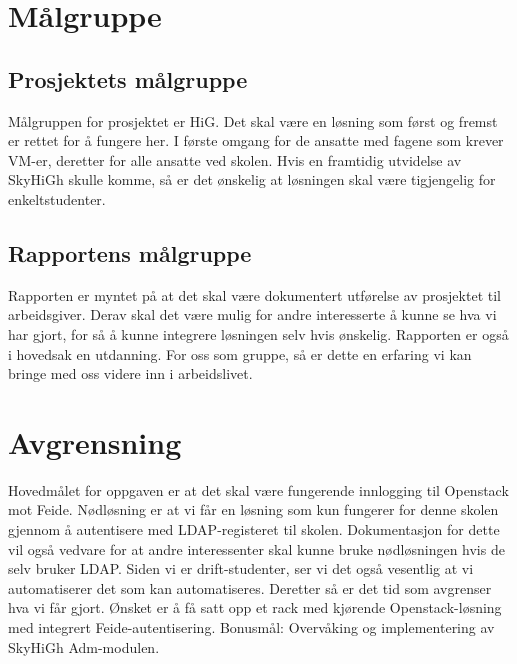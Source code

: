 \section{Målgruppe}
\subsection{Prosjektets målgruppe}
Målgruppen for prosjektet er HiG. Det skal være en løsning som først og fremst er rettet for å fungere her. I første omgang for de ansatte med fagene som krever VM-er, deretter for alle ansatte ved skolen. Hvis en framtidig utvidelse av SkyHiGh skulle komme, så er det ønskelig at løsningen skal være tigjengelig for enkeltstudenter.
\subsection{Rapportens målgruppe}
Rapporten er myntet på at det skal være dokumentert utførelse av prosjektet til arbeidsgiver. Derav skal det være mulig for andre interesserte å kunne se hva vi har gjort, for så å kunne integrere løsningen selv hvis ønskelig. Rapporten er også i hovedsak en utdanning. For oss som gruppe, så er dette en erfaring vi kan bringe med oss videre inn i arbeidslivet.
\section{Avgrensning}
Hovedmålet for oppgaven er at det skal være fungerende innlogging til Openstack mot Feide. Nødløsning er at vi får en løsning som kun fungerer for denne skolen gjennom å autentisere med LDAP-registeret til skolen. Dokumentasjon for dette vil også vedvare for at andre interessenter skal kunne bruke nødløsningen hvis de selv bruker LDAP. Siden vi er drift-studenter, ser vi det også vesentlig at vi automatiserer det som kan automatiseres. \newline \newline
Deretter så er det tid som avgrenser hva vi får gjort. Ønsket er å få satt opp et rack med kjørende Openstack-løsning med integrert Feide-autentisering. Bonusmål: Overvåking og implementering av SkyHiGh Adm-modulen.

